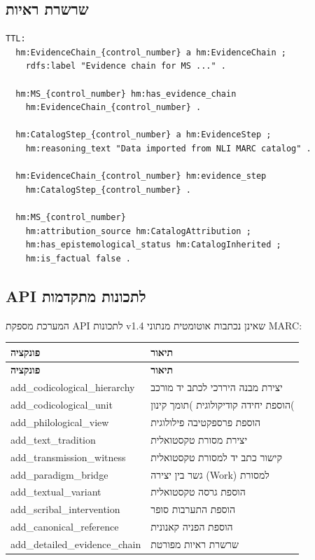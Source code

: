 \documentclass[12pt,a4paper]{article}
\begin{document}
\subsection{שרשרת ראיות}

\begin{LTR}
\begin{verbatim}
TTL:
  hm:EvidenceChain_{control_number} a hm:EvidenceChain ;
    rdfs:label "Evidence chain for MS ..." .
  
  hm:MS_{control_number} hm:has_evidence_chain
    hm:EvidenceChain_{control_number} .
  
  hm:CatalogStep_{control_number} a hm:EvidenceStep ;
    hm:reasoning_text "Data imported from NLI MARC catalog" .
  
  hm:EvidenceChain_{control_number} hm:evidence_step
    hm:CatalogStep_{control_number} .
  
  hm:MS_{control_number} 
    hm:attribution_source hm:CatalogAttribution ;
    hm:has_epistemological_status hm:CatalogInherited ;
    hm:is_factual false .
\end{verbatim}
\end{LTR}

\subsection{API לתכונות מתקדמות}

המערכת מספקת API לתכונות v1.4 שאינן נכתבות אוטומטית מנתוני MARC:

\begin{longtable}{|L{5cm}|p{11cm}|}
\hline
\textbf{פונקציה} & \textbf{תיאור} \\
\hline
\endfirsthead
\hline
\textbf{פונקציה} & \textbf{תיאור} \\
\hline
\endhead
\hline
\endfoot
\textenglish{add\_codicological\_hierarchy} & יצירת מבנה היררכי לכתב יד מורכב \\
\hline
\textenglish{add\_codicological\_unit} & הוספת יחידה קודיקולוגית )תומך קינון( \\
\hline
\textenglish{add\_philological\_view} & הוספת פרספקטיבה פילולוגית \\
\hline
\textenglish{add\_text\_tradition} & יצירת מסורת טקסטואלית \\
\hline
\textenglish{add\_transmission\_witness} & קישור כתב יד למסורת טקסטואלית \\
\hline
\textenglish{add\_paradigm\_bridge} & גשר בין יצירה \textenglish{(Work)} למסורת \\
\hline
\textenglish{add\_textual\_variant} & הוספת גרסה טקסטואלית \\
\hline
\textenglish{add\_scribal\_intervention} & הוספת התערבות סופר \\
\hline
\textenglish{add\_canonical\_reference} & הוספת הפניה קאנונית \\
\hline
\textenglish{add\_detailed\_evidence\_chain} & שרשרת ראיות מפורטת \\
\hline
\end{longtable}
\end{document}
